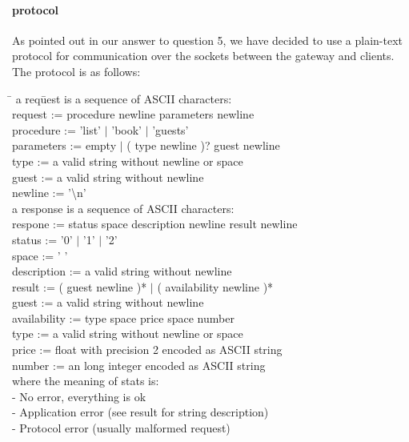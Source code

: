 \documentclass[a4paper,10pt]{article}
\begin{document}
\paragraph{protocol}
As pointed out in our answer to question 5, we have decided to use a plain-text protocol for communication over the sockets between the gateway and clients. The protocol is as follows:

\begin{tabbing}
\hspace{20pt}\=\kill
 \> a req\=uest is a sequence of ASCII characters: \+\\ 
 \> request := procedure newline parameters newline\\
 \> procedure := 'list' $\vert$ 'book' $\vert$ 'guests'\\
 \> parameters := empty $\vert$ ( type newline )? guest newline\\
 \> type := a valid string without newline or space\\ 
 \> guest := a valid string without newline\\
 \> newline := '\textbackslash n' \-\\ 
 \> a response is a sequence of ASCII characters:\+ \\
 \> respone := status space description newline result newline \\
 \> status := '0' $\vert$ '1' $\vert$ '2'\\
 \> space := ' '\\
 \> description := a valid string without newline\\
 \> result := ( guest newline )* $\vert$ ( availability newline )*\\
 \> guest := a valid string without newline\\
 \> availability := type space price space number\\
 \> type := a valid string without newline or space\\
 \> price := float with precision 2 encoded as ASCII string\\
 \> number := an long integer encoded as ASCII string \-\\
 \> where the meaning of stats is: \+\\
  - No error, everything is ok\\
  - Application error (see result for string description)\\
  - Protocol error (usually malformed request)\\
\end{tabbing}
\end{document}
